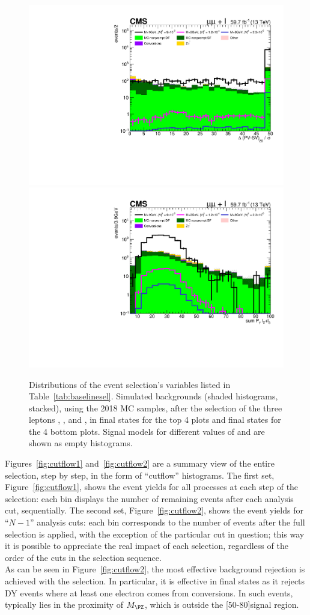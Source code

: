 \begin{figure}[h]
  \includegraphics[clip,trim=0.9cm 0.7cm 0.7cm 0.6cm,width=.35\textwidth]{Figures/c6/selection/18/mu_sigmaDeltaPV_SV_2D__0.pdf}
  \includegraphics[clip,trim=0.9cm 0.7cm 0.7cm 0.6cm,width=.35\textwidth]{Figures/c6/selection/18/mu_sum_Pt_L2L3__0.pdf}
  \caption{Distributions of the event selection's variables listed in
    Table~\ref{tab:baselinesel}. Simulated backgrounds (shaded histograms, stacked),
    using the 2018 MC samples, 
    after the selection of the three leptons \lone, \ltwo, and \lthree,
    in \eex final states for the top 4 plots and \mmx final states for
    the 4 bottom plots.
    Signal models for different values of \mhnl and \mixpar are shown
    as empty histograms.}
  \label{fig:selection_electrons}
\end{figure}


\clearpage
Figures~\ref{fig:cutflow1} and~\ref{fig:cutflow2} are a summary view of the entire selection,
step by step, in the form of ``cutflow'' histograms. The
first set, Figure~\ref{fig:cutflow1}, shows the event yields for all
processes at each step of the selection: each bin displays the number
of remaining events after each analysis cut, sequentially. The second set,
Figure~\ref{fig:cutflow2}, shows the event yields for ``$N-1$'' analysis
cuts: each bin corresponds to the number of events after the full
selection is applied, with the exception of the particular cut in
question; this way it is possible to appreciate the real impact of
each selection, regardless of the order of the cuts in the selection sequence.\\
As can be seen in Figure~\ref{fig:cutflow2}, the most effective
background rejection is achieved with the \mthreel selection. In
particular, it is effective in \eex final states as it rejects DY events
where at least one electron comes from conversions. In such events,
\mthreel typically lies in the proximity of $M_{\PZ}$, which is outside the
[50-80]\GeV signal region.

